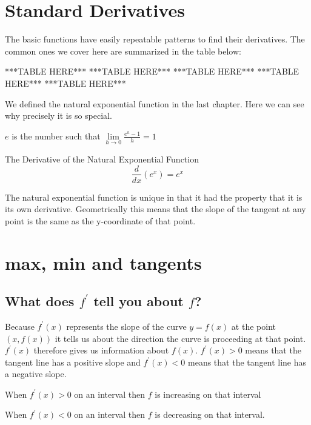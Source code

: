 \section{Standard Derivatives}
The basic functions have easily repeatable patterns to find their derivatives. The common ones we cover here are summarized in the table below:

***TABLE HERE***
***TABLE HERE***
***TABLE HERE***
***TABLE HERE***
***TABLE HERE***

We defined the natural exponential function in the last chapter. Here we can see why precisely it is so special.

$e$ is the number such that $\underset{h \rightarrow 0}{\lim }\frac{e^{h} -1}{h} =1$ 

\begin{tcolorbox}
The Derivative of the Natural Exponential Function
\begin{equation*}\frac{d}{d x} \left (e^{x}\right ) =e^{x}
\end{equation*}
\end{tcolorbox}

The natural exponential function is unique in that it had the property that it is its own derivative. Geometrically this means that the slope of the tangent at any point is the same as the y-coordinate of that point. 

\section{max, min and tangents}
\subsection{What does $f^{ \prime }$ tell you about $f$?}
Because $f^{ \prime } (x)$ represents the slope of the curve $y =f (x)$ at the point $\left (x ,f \left (x\right )\right )$ it tells us about the direction the curve is proceeding at that
point. $f^{ \prime } (x)$ therefore gives us information about $f (x)$. $f^{ \prime } (x) >0$ means that the tangent line has a positive slope and $f^{ \prime } (x) <0$ means that the tangent line has a negative slope. 

When $f^{ \prime } (x) >0$ on an interval then $f$ is increasing on that interval 

When $f^{ \prime } (x) <0$ on an interval then $f$ is decreasing on that interval. 

